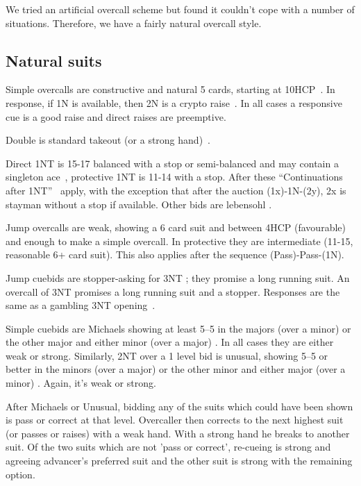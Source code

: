 \documentclass[a4paper,14pt]{extarticle}
\begin{document}
We tried an artificial overcall scheme but found it couldn't cope with a number of situations.
Therefore, we have a fairly natural overcall style.

\subsection{Natural suits}
\label{sec:def:1x}

Simple overcalls are constructive and natural 5 cards, starting at
10HCP~. In response, if 1N is available, then 2N is a crypto
raise~. In all cases a responsive cue is a good raise and
direct raises are preemptive.

Double is standard takeout (or a strong hand)~.

Direct 1NT is 15-17 balanced with a stop or semi-balanced and may contain a
singleton ace~, protective 1NT is 11-14 with a stop.  After these
``Continuations after 1NT''~ apply, with the exception that
after the auction (1x)-1N-(2y), 2x is stayman without a stop if available.
Other bids are lebensohl .

Jump overcalls are weak, showing a 6 card suit and between 4HCP (favourable)
and enough to make a simple overcall. In protective they are intermediate
(11-15, reasonable 6+ card suit). This also applies after the sequence (Pass)-Pass-(1N).

Jump cuebids are stopper-asking for 3NT ; they promise a long
running suit.  An overcall of 3NT promises a long running suit and a stopper.
Responses are the same as a gambling 3NT opening~.


Simple cuebids are Michaels showing at least 5--5 in the majors (over a minor)
or the other major and either minor (over a major) . In all cases they are
either weak or strong. Similarly, 2NT over a 1 level bid is unusual, showing
5--5 or better in the minors (over a major) or the other minor and either major
(over a minor) . Again, it's weak or strong.

After Michaels or Unusual, bidding any of the suits which could have been shown
is pass or correct at that level. Overcaller then corrects to the next highest
suit (or passes or raises) with a weak hand. With a strong hand he breaks to
another suit. Of the two suits which are not 'pass or correct', re-cueing is
strong and agreeing advancer's preferred suit and the other suit is strong with
the remaining option.
\end{document}
